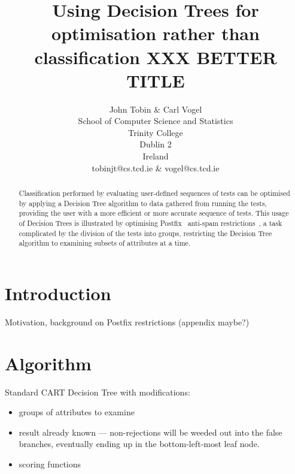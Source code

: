 \documentclass[twocolumn,a4paper,11pt,draft]{article}
\newcounter{dummy}
\begin{document}
\title{Using Decision Trees for optimisation rather than classification
XXX BETTER TITLE}
\author{John Tobin \& Carl Vogel \\ School of Computer Science and Statistics \\
Trinity College \\ Dublin 2 \\ Ireland \\ tobinjt@cs.tcd.ie \&
vogel@cs.tcd.ie }
\maketitle

\begin{abstract}

    Classification performed by evaluating user-defined sequences of tests
    can be optimised by applying a Decision Tree algorithm to data gathered
    from running the tests, providing the user with a more efficient or
    more accurate sequence of tests.  This usage of Decision Trees is
    illustrated by optimising Postfix~\cite{postfix} anti-spam
    restrictions~\cite{smtpd_access_readme}, a task complicated by the
    division of the tests into groups, restricting the Decision Tree
    algorithm to examining subsets of attributes at a time.

\end{abstract}

\section{Introduction}

Motivation, background on Postfix restrictions (appendix maybe?)

\section{Algorithm}

Standard CART Decision Tree with modifications: 

\begin{itemize}

    \item groups of attributes to examine

    \item result already known --- non-rejections will be weeded out into
        the false branches, eventually ending up in the bottom-left-most
        leaf node.

    \item scoring functions

\end{itemize}
\end{document}

